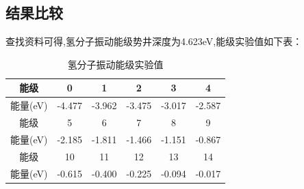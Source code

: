 \documentclass[11pt, a4paper, oneside]{ctexart}
\begin{document}
{{{{\begin{flushright}
        \end{flushright}
        



}
\subsection{结果比较}

{
    查找资料可得,氢分子振动能级势井深度为4.623eV,能级实验值如下表：


    {

    \begin{table}[h]
    \centering
    \caption{氢分子振动能级实验值}
    \begin{tabular}{@{}cccccc@{}}
    \toprule
    
    能级 & 0      & 1      & 2      & 3      & 4      \\ \midrule
    能量(eV) & -4.477 & -3.962 & -3.475 & -3.017 & -2.587 \\\cmidrule[1pt](){1-6}
    能级 & 5      & 6      & 7      & 8      & 9      \\\cmidrule(){1-6}
    能量(eV) & -2.185 & -1.811 & -1.466 & -1.151 & -0.867 \\\cmidrule[1pt](){1-6}
    能级 & 10     & 11     & 12     & 13     & 14     \\\cmidrule(){1-6}
    能量(eV) & -0.615 & -0.400 & -0.225 & -0.094 & -0.017 \\ \bottomrule
    \end{tabular}
    \end{table}
    }

}}}}
\end{document}
